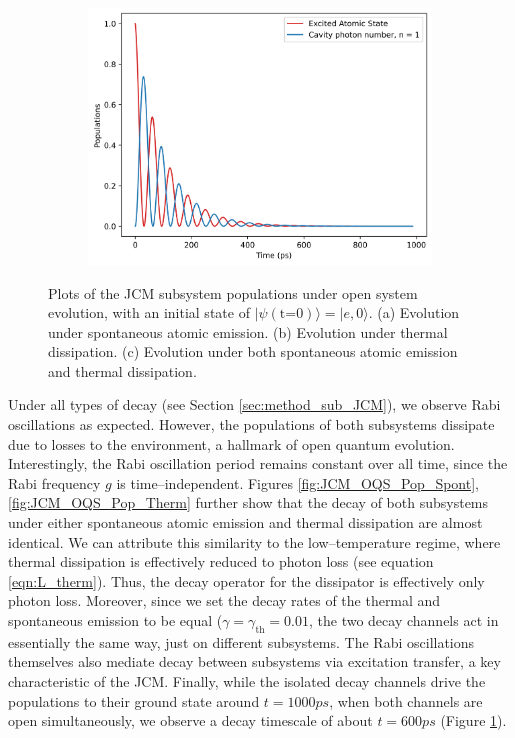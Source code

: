 \documentclass[11pt]{article}
\begin{document}
\begin{figure}[H]
    \vspace{0.5cm}
    
    \begin{subfigure}{0.45\textwidth} 
        \centering
        \includegraphics[width=\linewidth]{Research Project/Code/results/JCM/OQS_Pop_Both.png}
        \caption{}
         \label{fig:JCM_OQS_Pop_Both}
    \end{subfigure}
    \hfill
    \caption{Plots of the JCM subsystem populations under open system evolution, with an initial state of $|\psi (\text{t=0})\rangle = |e, 0\rangle$. (a) Evolution under spontaneous atomic emission. (b) Evolution under thermal dissipation. (c) Evolution under both spontaneous atomic emission and thermal dissipation.}
    \label{fig:JCM_OQS_Pop}
\end{figure}

\noindent Under all types of decay (see Section \ref{sec:method_sub_JCM}), we observe Rabi oscillations as expected. However, the populations of both subsystems dissipate due to losses to the environment, a hallmark of open quantum evolution. Interestingly, the Rabi oscillation period remains constant over all time, since the Rabi frequency $g$ is time--independent. Figures \ref{fig:JCM_OQS_Pop_Spont}, \ref{fig:JCM_OQS_Pop_Therm} further show that the decay of both subsystems under either spontaneous atomic emission and thermal dissipation are almost identical. We can attribute this similarity to the low--temperature regime, where thermal dissipation is effectively reduced to photon loss (see equation \eqref{eqn:L_therm}). Thus, the decay operator for the dissipator is effectively only photon loss. Moreover, since we set the decay rates of the thermal and spontaneous emission to be equal ($\gamma = \gamma_{\scriptscriptstyle \text{th}} =0.01$, the two decay channels act in essentially the same way, just on different subsystems. The Rabi oscillations themselves also mediate decay between subsystems via excitation transfer, a key characteristic of the JCM. Finally, while the isolated decay channels drive the populations to their ground state around $t = 1000 ps$, when both channels are open simultaneously, we observe a decay timescale of about $t = 600 ps$ (Figure \ref{fig:JCM_OQS_Pop_Both}). 
\end{document}

